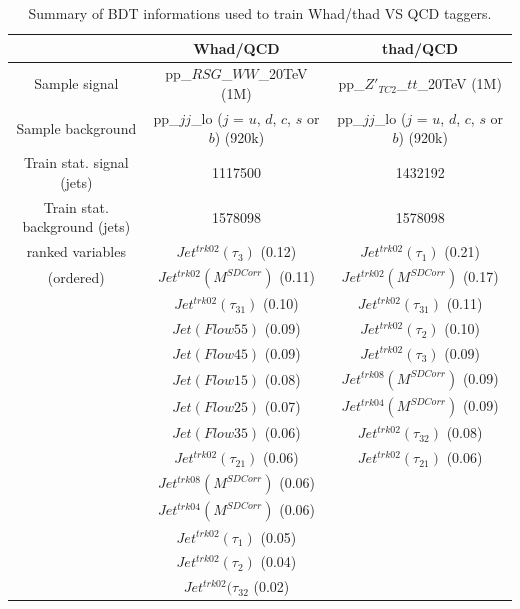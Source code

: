 \documentclass{cernrep}
\begin{document}
\begin{table}[!htb]\centering
\begin{tabular}{|c|c|c|}
\hline
\hline			
 & Whad/QCD & thad/QCD \\
\hline                        
Sample signal     & pp\_$RSG$\_$WW$\_20TeV (1M) & pp\_$Z'_{TC2}$\_$tt$\_20TeV (1M) \\
Sample background & pp\_$jj$\_lo ($j$ = $u$, $d$, $c$, $s$ or $b$) (920k) & pp\_$jj$\_lo ($j$ = $u$, $d$, $c$, $s$ or $b$) (920k)               \\
\hline
Train stat. signal (jets)     & 1117500 & 1432192 \\
Train stat. background (jets) & 1578098 & 1578098 \\
\hline
ranked variables & $Jet^{trk02}(\tau_3)$ (0.12)      & $Jet^{trk02}(\tau_1)$ (0.21) \\
(ordered)        & $Jet^{trk02}(M^{SD Corr})$ (0.11) & $Jet^{trk02}(M^{SD Corr})$ (0.17) \\
                 & $Jet^{trk02}(\tau_{31})$ (0.10)   & $Jet^{trk02}(\tau_{31})$ (0.11) \\
                 & $Jet(Flow55)$ (0.09)              & $Jet^{trk02}(\tau_2)$ (0.10) \\
                 & $Jet(Flow45)$ (0.09)              & $Jet^{trk02}(\tau_3)$ (0.09) \\
                 & $Jet(Flow15)$ (0.08)              & $Jet^{trk08}(M^{SD Corr})$ (0.09) \\
                 & $Jet(Flow25)$ (0.07)              & $Jet^{trk04}(M^{SD Corr})$ (0.09) \\
                 & $Jet(Flow35)$ (0.06)              & $Jet^{trk02}(\tau_{32})$ (0.08) \\
                 & $Jet^{trk02}(\tau_{21})$ (0.06)   & $Jet^{trk02}(\tau_{21})$ (0.06) \\
                 & $Jet^{trk08}(M^{SD Corr})$ (0.06) &  \\
                 & $Jet^{trk04}(M^{SD Corr})$ (0.06) &  \\
                 & $Jet^{trk02}(\tau_1)$ (0.05)      &  \\
                 & $Jet^{trk02}(\tau_2)$ (0.04)      &  \\
                 & $Jet^{trk02}(\tau_{32}$ (0.02)    &  \\
\hline
\hline
\end{tabular}
\caption{Summary of BDT informations used to train Whad/thad VS QCD taggers.}
\label{tab:TMVA_summary}
\end{table}
\end{document}
